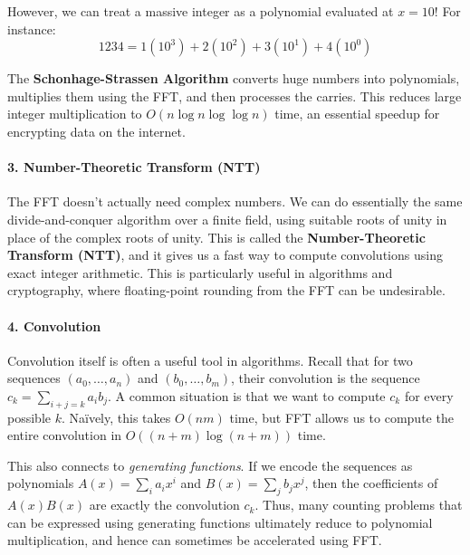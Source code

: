 \documentclass[11  pt]{article}
\begin{document}
However, we can treat a massive integer as a polynomial evaluated at $x=10$! For instance:
\begin{equation*}
    1234 = 1(10^3) + 2(10^2) + 3(10^1) + 4(10^0)
\end{equation*}

The \textbf{Schonhage-Strassen Algorithm} converts huge numbers into polynomials, multiplies them using the FFT, and then processes the carries. This reduces large integer multiplication to $O(n \log n \log \log n)$ time, an essential speedup for encrypting data on the internet.

\vs{1cm}

\paragraph{3. Number-Theoretic Transform (NTT)} The FFT doesn't actually need complex numbers. We can do essentially the same divide-and-conquer algorithm over a finite field, using suitable roots of unity in place of the complex roots of unity. This is called the \textbf{Number-Theoretic Transform (NTT)}, and it gives us a fast way to compute convolutions using exact integer arithmetic. This is particularly useful in algorithms and cryptography, where floating-point rounding from the FFT can be undesirable.

\vs{1cm}

\paragraph{4. Convolution}
Convolution itself is often a useful tool in algorithms. 
Recall that for two sequences $(a_0,\ldots,a_n)$ and $(b_0,\ldots,b_m)$, their convolution is the sequence $c_k = \sum_{i+j=k} a_i b_j$. 
A common situation is that we want to compute $c_k$ for every possible $k$. 
Na\"{i}vely, this takes $O(nm)$ time, but FFT allows us to compute the entire convolution in $O((n+m)\log(n+m))$ time.

\vs{0.3in}

This also connects to \emph{generating functions}. If we encode the sequences as polynomials $A(x)=\sum_i a_i x^i$ and $B(x)=\sum_j b_j x^j$, then the coefficients of $A(x)B(x)$ are exactly the convolution $c_k$. 
Thus, many counting problems that can be expressed using generating functions ultimately reduce to polynomial multiplication, and hence can sometimes be accelerated using FFT.

\vs{1in}
\end{document}
